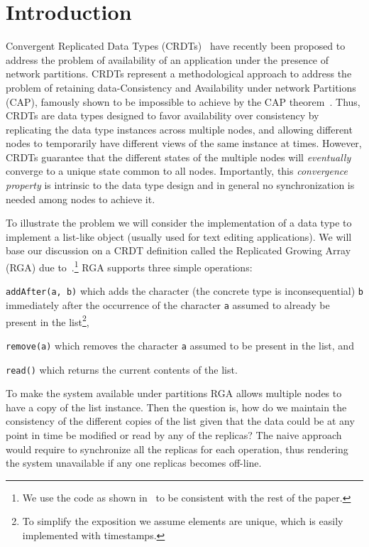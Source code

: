 \section{Introduction}
\label{sec:introduction}

Convergent Replicated Data Types (CRDTs)~\cite{ShapiroPBZ11} have
recently been proposed to address the problem of availability of an
application under the presence of network partitions.
%
CRDTs represent a methodological approach to address the problem of
retaining data-Consistency and Availability under network Partitions (CAP),
famously shown to be impossible to achieve by the CAP
theorem~\cite{GilbertL02}.
%
Thus, CRDTs are data types designed to favor availability over
consistency by replicating the data type instances across multiple
nodes, and allowing different nodes to temporarily have different
views of the same instance at times.
%
However, CRDTs guarantee that the different states of the multiple
nodes will \emph{eventually} converge to a unique state common to all
nodes.
%
Importantly, this \emph{convergence property} is intrinsic to the data
type design and in general no synchronization is needed among nodes to
achieve it.

To illustrate the problem we will consider the implementation of a
data type to implement a list-like object (usually used for text
editing applications).
%
We will base our discussion on a CRDT definition called the Replicated
Growing Array (RGA) due to~\cite{RohJKL11}.\footnote{We use the code
  as shown in~\cite{ShapiroPBZ11} to be consistent with the rest of
  the paper.}
%
RGA supports three simple operations:
\begin{inparaenum}
\item \lstinline|addAfter(a, b)| which adds the character (the
  concrete type is inconsequential)
  \lstinline|b| immediately after the occurrence of the character
  \lstinline|a| assumed to already be present in the list\footnote{To
    simplify the exposition we assume elements are unique, which is easily
    implemented with timestamps.},
\item \lstinline|remove(a)| which removes the character \lstinline|a|
  assumed to be present in the list, and
\item \lstinline|read()| which returns the current contents of the
  list.
\end{inparaenum}

To make the system available under partitions RGA allows multiple
nodes to have a copy of the list instance.
%
Then the question is, how do we maintain the consistency of the
different copies of the list given that the data could be at any point
in time be modified or read by any of the replicas?
%
The naive approach would require to synchronize all the replicas for
each operation, thus rendering the system unavailable if any one
replicas becomes off-line.

